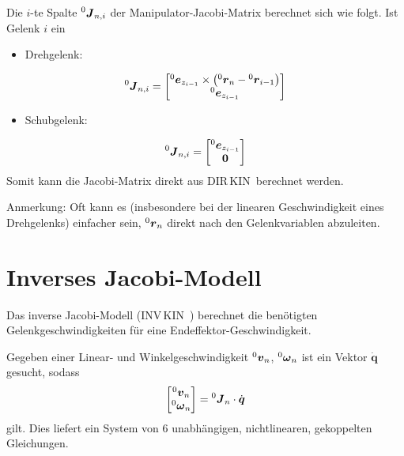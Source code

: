 \documentclass[a4paper, 11pt, accentcolor = tud3b]{tudreport}
\newcommand{\inreferenceto}[2]{\prescript{#1}{}{#2}}
\newcommand{\mat}[1]{\boldsymbol{#1}}
\renewcommand{\vec}[1]{\boldsymbol{#1}}
\newcommand{\DIRKIN}{DIR\,KIN~}
\newcommand{\INVKIN}{INV\,KIN~}
\begin{document}
				Die \(i\)-te Spalte \( \inreferenceto{0}{\vec{J}}_{n, i} \) der Manipulator-Jacobi-Matrix berechnet sich wie folgt. Ist Gelenk \(i\) ein
				\begin{itemize}
					\item Drehgelenk:
				\end{itemize}
				\begin{equation*}
					\inreferenceto{0}{\vec{J}}_{n, i} =
						\begin{bmatrix}
							\inreferenceto{0}{\vec{e}}_{z_{i - 1}} \times \big(\! \inreferenceto{0}{\vec{r}}_n - \inreferenceto{0}{\vec{r}}_{i - 1} \big) \\
							\inreferenceto{0}{\vec{e}}_{z_{i - 1}}
						\end{bmatrix}
				\end{equation*}
				\begin{itemize}
					\item Schubgelenk:
				\end{itemize}
				\begin{equation*}
					\inreferenceto{0}{\vec{J}}_{n, i} =
						\begin{bmatrix}
							\inreferenceto{0}{\vec{e}}_{z_{i - 1}} \\
							\vec{0}
						\end{bmatrix}
				\end{equation*}
				Somit kann die Jacobi-Matrix direkt aus \DIRKIN berechnet werden.
				
				Anmerkung: Oft kann es (insbesondere bei der linearen Geschwindigkeit eines Drehgelenks) einfacher sein, \( \inreferenceto{0}{\vec{r}}_n \) direkt nach den Gelenkvariablen abzuleiten.

		\section{Inverses Jacobi-Modell}
			Das inverse Jacobi-Modell (\INVKIN) berechnet die benötigten Gelenkgeschwindigkeiten für eine Endeffektor-Geschwindigkeit.

			Gegeben einer Linear- und Winkelgeschwindigkeit \( \inreferenceto{0}{\vec{v}}_n \), \( \inreferenceto{0}{\vec{\omega}}_n \) ist ein Vektor \( \dot{\vec{q}} \) gesucht, sodass
			\begin{equation*}
				\begin{bmatrix}
					\inreferenceto{0}{\vec{v}}_n \\
					\inreferenceto{0}{\vec{\omega}}_n
				\end{bmatrix}
				=
				\inreferenceto{0}{\mat{J}}_n \cdot \dot{\vec{q}}
			\end{equation*}
			gilt. Dies liefert ein System von \(6\) unabhängigen, nichtlinearen, gekoppelten Gleichungen.
\end{document}
